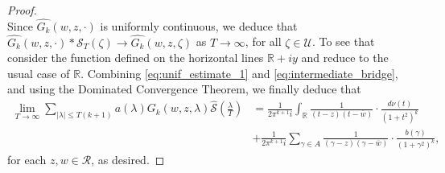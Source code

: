 \documentclass[10pt,a4paper]{amsart}
\newcommand{\R}{\mathcal{R}}
\renewcommand{\S}{\mathcal{S}}
\newcommand{\U}{\mathcal{U}}
\newcommand{\cd}{\cdot}
\newcommand{\ft}{\widehat}
\newcommand{\ga}{\gamma}
\newcommand{\la}{\lambda}
\newcommand{\ov}[1]{\overline{#1}}
\renewcommand{\r}{\mathbb{R}}
\newcommand{\ra}{\rightarrow}
\newcommand{\w}{\ov{w}}
\begin{document}
\begin{proof}
\begin{equation}
\end{equation}
Since $\ft{G_k}(w,z,\cd)$ is uniformly continuous, we deduce that $\ft{G_k}(w,z,\cd)*\S_T(\zeta)\to \ft{G_k}(w,z,\zeta)$ as $T\ra\infty$, for all $\zeta\in\U$. To see that consider the function defined on the horizontal lines $\r+iy$ and reduce to the usual case of $\r$. Combining \eqref{eq:unif_estimate_1} and \eqref{eq:intermediate_bridge}, and using the Dominated Convergence Theorem, we finally deduce that
\begin{align*}
\lim_{T\ra\infty} \sum_{|\la|\leq T(k+1)} a(\la)G_k(w,z,\la)\ft{\S}\left(\frac{\la}{T}\right)&=\frac{1}{2\pi^{k+1}i}\int_{\r} \frac{1}{(t-z)(t-\w)}\cd\frac{d\nu(t)}{(1+t^2)^k}\\
&+\frac{1}{2\pi^{k+1}i}\sum_{\ga\in A} \frac{1}{(\ga-z)(\ga-\w)}\cd\frac{b(\ga)}{(1+\ga^2)^k},
\end{align*}
for each $z,w\in\R$, as desired. 
\end{proof}
\end{document}
